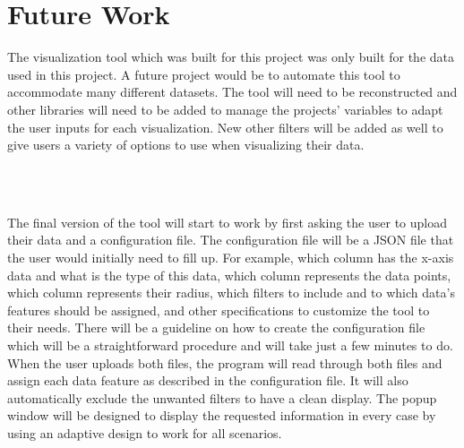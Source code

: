 \section{Future Work}

The visualization tool which was built for this project was only built for the data used in this project. A future project would be to automate this tool to accommodate many different datasets. The tool will need to be reconstructed and other libraries will need to be added to manage the projects' variables to adapt the user inputs for each visualization. New other filters will be added as well to give users a variety of options to use when visualizing their data. 

\\\

The final version of the tool will start to work by first asking the user to upload their data and a configuration file. The configuration file will be a JSON file that the user would initially need to fill up. For example, which column has the x-axis data and what is the type of this data, which column represents the data points, which column represents their radius, which filters to include and to which data's features should be assigned, and other specifications to customize the tool to their needs. There will be a guideline on how to create the configuration file which will be a straightforward procedure and will take just a few minutes to do. When the user uploads both files, the program will read through both files and assign each data feature as described in the configuration file. It will also automatically exclude the unwanted filters to have a clean display. The popup window will be designed to display the requested information in every case by using an adaptive design to work for all scenarios.  